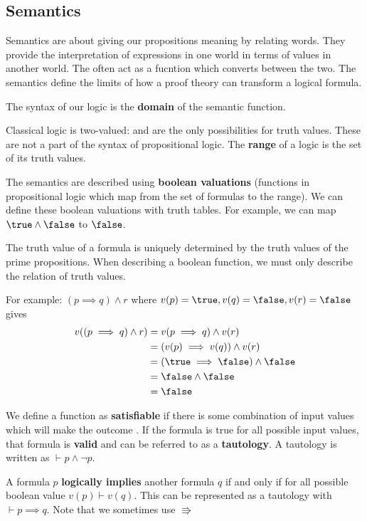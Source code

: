 \documentclass[12pt]{article}
\begin{document}
\subsection*{Semantics}
Semantics are about giving our propositions meaning by relating words. They provide the interpretation of expressions in one world in terms of values in another world. The often act as a fucntion which converts between the two. The semantics define the limits of how a proof theory can transform a logical formula.

The syntax of our logic is the {\bf domain} of the semantic function.

Classical logic is two-valued: \true and \false are the only possibilities for truth values. These are not a part of the syntax of propositional logic. The {\bf range} of a logic is the set of its truth values.

The semantics are described using {\bf boolean valuations} (functions in propositional logic which map from the set of formulas to the range). We can define these boolean valuations with truth tables. For example, we can map $\true \land \false$ to $\false$.

The truth value of a formula is uniquely determined by the truth values of the prime propositions. When describing a boolean function, we must only describe the relation of truth values.

For example: $(p \implies q) \land r$ where $v(p) = \true, v(q) = \false, v(r) = \false$ gives
\begin{align*}
v((p \implies q) \land r) &= v(p \implies q) \land v(r)\\
                          &= (v(p) \implies v(q)) \land v(r)\\
                          &= (\true \implies \false) \land \false\\
                          &= \false \land \false\\
                          &= \false
\end{align*}

We define a function as {\bf satisfiable} if there is some combination of input values which will make the outcome \true . If the formula is true for all possible input values, that formula is {\bf valid} and can be referred to as a {\bf tautology}. A tautology is written as $\vdash p \land \neg p$.

A formula $p$ {\bf logically implies} another formula $q$ if and only if for all possible boolean value $v(p) \vdash v(q)$. This can be represented as a tautology with $\vdash p \implies q$. Note that we sometimes use $\Rrightarrow$
\end{document}

